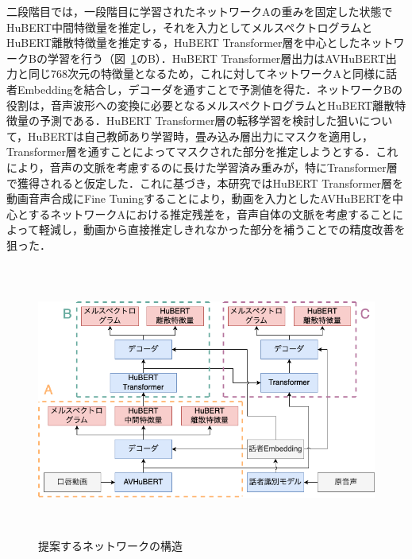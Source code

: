 \documentclass[12pt]{jarticle}
\numberwithin{equation}{section}    %
\numberwithin{figure}{section}      %
\numberwithin{table}{section}      %
\begin{document}
二段階目では，一段階目に学習されたネットワークAの重みを固定した状態でHuBERT中間特徴量を推定し，それを入力としてメルスペクトログラムとHuBERT離散特徴量を推定する，HuBERT Transformer層を中心としたネットワークBの学習を行う（図~\ref{sec4:fig:network}のB）．HuBERT Transformer層出力はAVHuBERT出力と同じ768次元の特徴量となるため，これに対してネットワークAと同様に話者Embeddingを結合し，デコーダを通すことで予測値を得た．ネットワークBの役割は，音声波形への変換に必要となるメルスペクトログラムとHuBERT離散特徴量の予測である．HuBERT Transformer層の転移学習を検討した狙いについて，HuBERTは自己教師あり学習時，畳み込み層出力にマスクを適用し，Transformer層を通すことによってマスクされた部分を推定しようとする．これにより，音声の文脈を考慮するのに長けた学習済み重みが，特にTransformer層で獲得されると仮定した．これに基づき，本研究ではHuBERT Transformer層を動画音声合成にFine Tuningすることにより，動画を入力としたAVHuBERTを中心とするネットワークAにおける推定残差を，音声自体の文脈を考慮することによって軽減し，動画から直接推定しきれなかった部分を補うことでの精度改善を狙った．

\begin{figure}[bt]
    \centering
    \includegraphics[height=90mm]{./figure/sec4/model/network.drawio.png}
    \caption{提案するネットワークの構造}
    \label{sec4:fig:network}
\end{figure}
\end{document}
